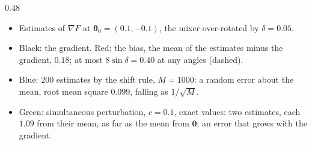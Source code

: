 \documentclass[handoutsbeamer.tex]{subfiles}
\begin{document}
\begin{frame}
{\begin{columns}[c]
\begin{column}{0.48\textwidth}\footnotesize\begin{itemize}\setlength\itemsep{0.3em}
    \item Estimates of $\nabla F$ at $\boldsymbol\theta_0 = (0.1,-0.1)$, the mixer over-rotated by $\delta = 0.05$.
    \item Black: the gradient. Red: the bias, the mean of the estimates minus the gradient, $0.18$; at most $8\sin\delta = 0.40$ at any angles (dashed).
    \item Blue: $200$ estimates by the shift rule, $M = 1000$: a random error about the mean, root mean square $0.099$, falling as $1/\sqrt M$.
    \item Green: simultaneous perturbation, $c = 0.1$, exact values: two estimates, each $1.09$ from their mean, as far as the mean from $\boldsymbol 0$; an error that grows with the gradient.
\end{itemize}\end{column}\end{columns}}
\end{frame}
\end{document}
